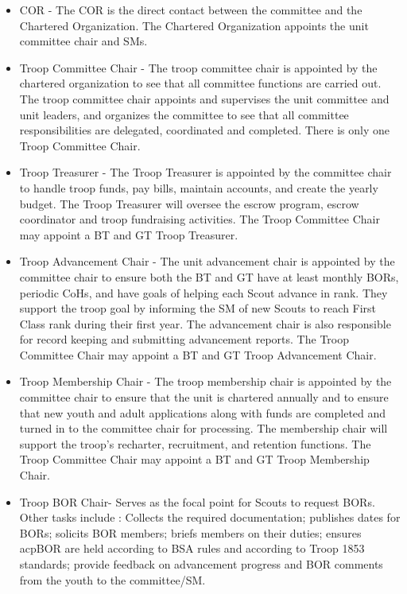 \documentclass{ltxguide}
\begin{document}
\begin{itemize}
	\item \ac{COR} - The \ac{COR} is the direct contact between the committee and the Chartered Organization. The Chartered Organization appoints the unit committee chair and \acp{SM}.

	\item Troop Committee Chair - The troop committee chair is appointed by the chartered organization to see that all committee functions are carried out. The troop committee chair appoints and supervises the unit committee and unit leaders, and organizes the committee to see that all committee responsibilities are delegated, coordinated and completed. There is only one Troop Committee Chair.

	\item Troop Treasurer - The Troop Treasurer is appointed by the committee chair to handle troop funds, pay bills, maintain accounts, and create the yearly budget. The Troop Treasurer will oversee the escrow program, escrow coordinator and troop fundraising activities. The Troop Committee Chair may appoint a \ac{BT} and \ac{GT} Troop Treasurer.

	\item Troop Advancement Chair - The unit advancement chair is appointed by the committee chair to ensure both the \ac{BT} and \ac{GT} have at least monthly \acp{BOR}, periodic \acp{CoH}, and have goals of helping each Scout advance in rank. They support the troop goal by informing the \ac{SM} of new Scouts to reach First Class rank during their first year. The advancement chair is also responsible for record keeping and submitting advancement reports. The Troop Committee Chair may appoint a \ac{BT} and \ac{GT} Troop Advancement Chair.

	\item Troop Membership Chair - The troop membership chair is appointed by the committee chair to ensure that the unit is chartered annually and to ensure that new youth and adult applications along with funds are completed and turned in to the committee chair for processing. The membership chair will support the troop's recharter, recruitment, and retention functions. The Troop Committee Chair may appoint a \ac{BT} and \ac{GT} Troop Membership Chair.

	\item Troop \ac{BOR} Chair- Serves as the focal point for Scouts to request \acp{BOR}. Other tasks include : Collects the required documentation; publishes dates for \acp{BOR}; solicits \ac{BOR} members; briefs members on their duties; ensures acp{BOR} are held according to \ac{BSA} rules and according to Troop 1853 standards; provide feedback on advancement progress and \ac{BOR} comments from the youth to the committee/\ac{SM}.


\end{itemize}
\end{document}
